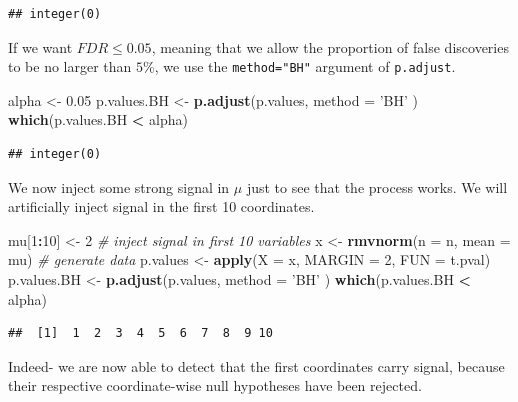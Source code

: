 \documentclass[]{book}
\newenvironment{Shaded}{\begin{snugshade}}{\end{snugshade}}
\newcommand{\CommentTok}[1]{\textcolor[rgb]{0.56,0.35,0.01}{\textit{#1}}}
\newcommand{\DataTypeTok}[1]{\textcolor[rgb]{0.13,0.29,0.53}{#1}}
\newcommand{\DecValTok}[1]{\textcolor[rgb]{0.00,0.00,0.81}{#1}}
\newcommand{\FloatTok}[1]{\textcolor[rgb]{0.00,0.00,0.81}{#1}}
\newcommand{\KeywordTok}[1]{\textcolor[rgb]{0.13,0.29,0.53}{\textbf{#1}}}
\newcommand{\NormalTok}[1]{#1}
\newcommand{\OperatorTok}[1]{\textcolor[rgb]{0.81,0.36,0.00}{\textbf{#1}}}
\newcommand{\StringTok}[1]{\textcolor[rgb]{0.31,0.60,0.02}{#1}}
\theoremstyle{definition}
\theoremstyle{definition}
\theoremstyle{definition}
\theoremstyle{remark}
\begin{document}
\begin{verbatim}
## integer(0)
\end{verbatim}

If we want \(FDR \leq 0.05\), meaning that we allow the proportion of false discoveries to be no larger than \(5\%\), we use the \texttt{method="BH"} argument of \texttt{p.adjust}.

\begin{Shaded}
\begin{Highlighting}[]
\NormalTok{alpha <-}\StringTok{ }\FloatTok{0.05}
\NormalTok{p.values.BH <-}\StringTok{ }\KeywordTok{p.adjust}\NormalTok{(p.values, }\DataTypeTok{method =} \StringTok{'BH'}\NormalTok{ )}
\KeywordTok{which}\NormalTok{(p.values.BH }\OperatorTok{<}\StringTok{ }\NormalTok{alpha)}
\end{Highlighting}
\end{Shaded}

\begin{verbatim}
## integer(0)
\end{verbatim}

We now inject some strong signal in \(\mu\) just to see that the process works.
We will artificially inject signal in the first 10 coordinates.

\begin{Shaded}
\begin{Highlighting}[]
\NormalTok{mu[}\DecValTok{1}\OperatorTok{:}\DecValTok{10}\NormalTok{] <-}\StringTok{ }\DecValTok{2} \CommentTok{# inject signal in first 10 variables}
\NormalTok{x <-}\StringTok{ }\KeywordTok{rmvnorm}\NormalTok{(}\DataTypeTok{n =}\NormalTok{ n, }\DataTypeTok{mean =}\NormalTok{ mu) }\CommentTok{# generate data}
\NormalTok{p.values <-}\StringTok{ }\KeywordTok{apply}\NormalTok{(}\DataTypeTok{X =}\NormalTok{ x, }\DataTypeTok{MARGIN =} \DecValTok{2}\NormalTok{, }\DataTypeTok{FUN =}\NormalTok{ t.pval) }
\NormalTok{p.values.BH <-}\StringTok{ }\KeywordTok{p.adjust}\NormalTok{(p.values, }\DataTypeTok{method =} \StringTok{'BH'}\NormalTok{ )}
\KeywordTok{which}\NormalTok{(p.values.BH }\OperatorTok{<}\StringTok{ }\NormalTok{alpha)}
\end{Highlighting}
\end{Shaded}

\begin{verbatim}
##  [1]  1  2  3  4  5  6  7  8  9 10
\end{verbatim}

Indeed- we are now able to detect that the first coordinates carry signal, because their respective coordinate-wise null hypotheses have been rejected.
\end{document}
